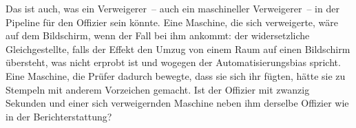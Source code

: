 Das ist auch, was ein Verweigerer~– auch ein maschineller Verweigerer~– in der Pipeline für den Offizier sein könnte. Eine Maschine, die sich verweigerte, wäre auf dem Bildschirm, wenn der Fall bei ihm ankommt: der widersetzliche Gleichgestellte, falls der Effekt den Umzug von einem Raum auf einen Bildschirm übersteht, was nicht erprobt ist und wogegen der Automatisierungsbias spricht. Eine Maschine, die Prüfer dadurch bewegte, dass sie sich ihr fügten, hätte sie zu Stempeln mit anderem Vorzeichen gemacht. Ist der Offizier mit zwanzig Sekunden und einer sich verweigernden Maschine neben ihm derselbe Offizier wie in der Berichterstattung?
